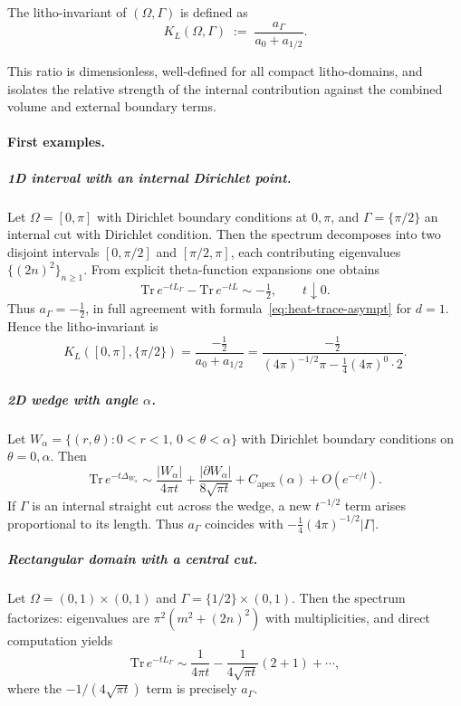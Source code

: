 \begin{definition}
The litho-invariant of $(\Omega,\Gamma)$ is defined as
\begin{equation}\label{eq:def-KL}
K_L(\Omega,\Gamma) \;:=\;
\frac{a_\Gamma}{a_0 + a_{1/2}}.
\end{equation}
\end{definition}

This ratio is dimensionless, well-defined for all compact litho-domains,
and isolates the relative strength of the internal contribution
against the combined volume and external boundary terms.

\paragraph{First examples.}

\subparagraph{1D interval with an internal Dirichlet point.}
Let $\Omega = [0,\pi]$ with Dirichlet boundary conditions at $0,\pi$,
and $\Gamma=\{\pi/2\}$ an internal cut with Dirichlet condition.
Then the spectrum decomposes into two disjoint intervals
$[0,\pi/2]$ and $[\pi/2,\pi]$, each contributing eigenvalues
$\{(2n)^2\}_{n\geq 1}$.
From explicit theta-function expansions one obtains
\begin{equation}
\mathrm{Tr}\,e^{-tL_\Gamma} - \mathrm{Tr}\,e^{-tL}
\sim -\tfrac12, \qquad t\downarrow 0.
\end{equation}
Thus $a_\Gamma = -\tfrac12$, in full agreement with
formula~\eqref{eq:heat-trace-asympt} for $d=1$.
Hence the litho-invariant is
\begin{equation}
K_L([0,\pi],\{\pi/2\}) = \frac{-\tfrac12}{a_0+a_{1/2}}
= \frac{-\tfrac12}{(4\pi)^{-1/2}\pi - \tfrac14 (4\pi)^0 \cdot 2}.
\end{equation}

\subparagraph{2D wedge with angle $\alpha$.}
Let $W_\alpha=\{(r,\theta):0<r<1,\,0<\theta<\alpha\}$
with Dirichlet boundary conditions on $\theta=0,\alpha$.
Then
\begin{equation}
\mathrm{Tr}\,e^{-t\Delta_{W_\alpha}} \sim \frac{|W_\alpha|}{4\pi t}
+ \frac{|\partial W_\alpha|}{8\sqrt{\pi t}}
+ C_{\mathrm{apex}}(\alpha) + O(e^{-c/t}).
\end{equation}
If $\Gamma$ is an internal straight cut across the wedge,
a new $t^{-1/2}$ term arises proportional to its length.
Thus $a_\Gamma$ coincides with $-\tfrac14(4\pi)^{-1/2}|\Gamma|$.

\subparagraph{Rectangular domain with a central cut.}
Let $\Omega=(0,1)\times (0,1)$ and $\Gamma=\{1/2\}\times (0,1)$.
Then the spectrum factorizes: eigenvalues are
$\pi^2(m^2+(2n)^2)$ with multiplicities,
and direct computation yields
\begin{equation}
\mathrm{Tr}\,e^{-tL_\Gamma} \sim \frac{1}{4\pi t}
- \frac{1}{4\sqrt{\pi t}}(2+1) + \cdots,
\end{equation}
where the $-1/(4\sqrt{\pi t})$ term is precisely $a_\Gamma$.

